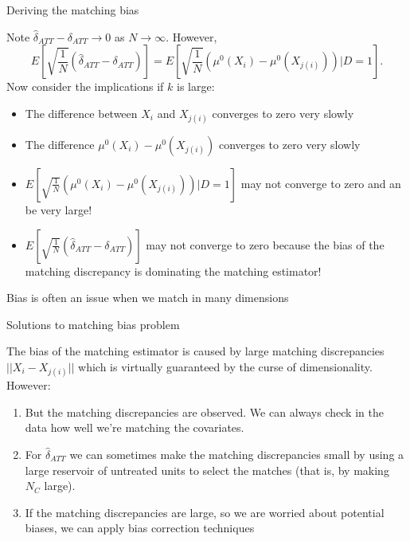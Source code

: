 \documentclass{beamer}
\begin{document}
\begin{frame}{Deriving the matching bias}
	
Note $\widehat{\delta}_{ATT} - \delta_{ATT} \to 0$ as $N \to \infty$.
\pause However, 
$$E[ \sqrt{\frac{1}{N}} (\widehat{\delta}_{ATT} - \delta_{ATT})] = E[ \sqrt{\frac{1}{N}} ( \mu^0(X_i) - \mu^0(X_{j(i)}) ) | D=1].$$ 
\pause
Now consider the implications if $k$ is large:
\pause	\begin{itemize}
	\item The difference between $X_i$ and $X_{j(i)}$ converges to zero very slowly 
\pause	\item The difference $\mu^0(X_i) - \mu^0(X_{j(i)})$ converges to zero very slowly \pause
	\item $E[ \sqrt{\frac{1}{N}} (\mu^0(X_i) - \mu^0(X_{j(i)})) | D=1]$ may not converge to zero and an be very large! 
\pause	\item $E[ \sqrt{\frac{1}{N}} (\widehat{\delta}_{ATT} - \delta_{ATT})]$ may not converge to zero because the bias of the matching discrepancy is dominating the matching estimator! \pause
	\end{itemize}
 Bias is often an issue when we match in many dimensions
\end{frame}

\begin{frame}{Solutions to matching bias problem}
	
The bias of the matching estimator is caused by large matching discrepancies $||X_i - X_{j(i)}||$ which is virtually guaranteed by the curse of dimensionality.  However:
	\begin{enumerate}
	\item But the matching discrepancies are observed. We can always check in the data how well we're matching the covariates.

	\item For $\widehat{\delta}_{ATT}$ we can sometimes make the matching discrepancies small by using a large reservoir of untreated units to select the matches (that is, by making $N_C$ large).

  \item If the matching discrepancies are large, so we are worried about potential biases, we can apply bias correction techniques

	\end{enumerate}
\end{frame}
\end{document}
